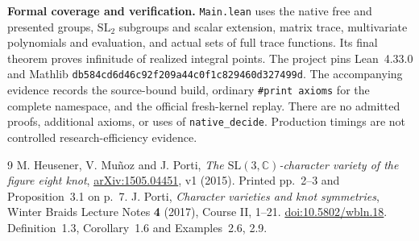 \documentclass[10pt,a4paper]{article}
\begin{document}
\textbf{Formal coverage and verification.}
\texttt{Main.lean} uses the native free and presented groups,
$\mathrm{SL}_2$ subgroups and scalar extension, matrix trace,
multivariate polynomials and evaluation, and actual sets of full trace
functions. Its final theorem proves infinitude of realized integral points.
The project pins Lean~4.33.0 and Mathlib
\texttt{db584cd6d46c92f209a44c0f1c829460d327499d}.
The accompanying evidence records the source-bound build, ordinary
\texttt{\#print axioms} for the complete namespace, and the official
fresh-kernel replay. There are no admitted proofs, additional axioms,
or uses of \texttt{native\_decide}. Production timings are not controlled
research-efficiency evidence.

\begin{thebibliography}{9}
 M. Heusener, V. Mu\~noz and J. Porti,
\emph{The $\mathrm{SL}(3,\mathbb C)$-character variety of the figure eight knot},
\href{https://arxiv.org/abs/1505.04451}{arXiv:1505.04451}, v1 (2015).
Printed pp.~2--3 and Proposition~3.1 on p.~7.
 J. Porti, \emph{Character varieties and knot symmetries},
Winter Braids Lecture Notes \textbf{4} (2017), Course II, 1--21.
\href{https://doi.org/10.5802/wbln.18}{doi:10.5802/wbln.18}.
Definition~1.3, Corollary~1.6 and Examples~2.6, 2.9.
\end{thebibliography}
\end{document}
